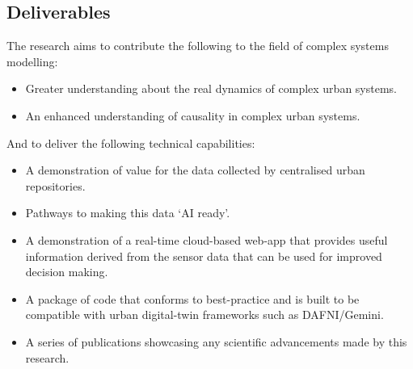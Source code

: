 \subsection{Deliverables}
The research aims to contribute the following to the field of complex systems modelling:

\begin{itemize}
    \item Greater understanding about the real dynamics of complex urban systems.
    \item An enhanced understanding of causality in complex urban systems.
\end{itemize}

And to deliver the following technical capabilities:

\begin{itemize}
    \item A demonstration of value for the data collected by centralised urban repositories.
    \item Pathways to making this data ‘AI ready’.
    \item A demonstration of a real-time cloud-based web-app that provides useful information derived from the sensor data that can be used for improved decision making.
    \item A package of code that conforms to best-practice and is built to be compatible with urban digital-twin frameworks such as DAFNI/Gemini.
    \item A series of publications showcasing any scientific advancements made by this research.
\end{itemize}